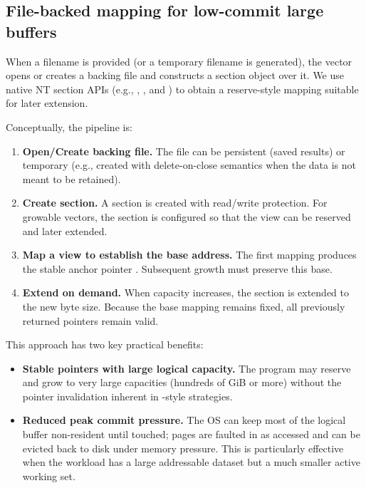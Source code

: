 \subsection{File-backed mapping for low-commit large buffers}
\label{sec:file_backed_mapping}

When a filename is provided (or a temporary filename is generated), the vector
opens or creates a backing file and constructs a section object over it. We use
native NT section APIs (e.g., ,
, and ) to obtain a
reserve-style mapping suitable for later extension.

Conceptually, the pipeline is:
\begin{enumerate}
  \item \textbf{Open/Create backing file.} The file can be persistent (saved
  results) or temporary (e.g., created with delete-on-close semantics when the
  data is not meant to be retained).
  \item \textbf{Create section.} A section is created with read/write
  protection. For growable vectors, the section is configured so that the view
  can be reserved and later extended.
  \item \textbf{Map a view to establish the base address.} The first mapping
  produces the stable anchor pointer . Subsequent growth must
  preserve this base.
  \item \textbf{Extend on demand.} When capacity increases, the section is
  extended to the new byte size. Because the base mapping remains fixed, all
  previously returned pointers remain valid.
\end{enumerate}

This approach has two key practical benefits:
\begin{itemize}
  \item \textbf{Stable pointers with large logical capacity.} The program may
  reserve and grow to very large capacities (hundreds of GiB or more) without
  the pointer invalidation inherent in -style strategies.
  \item \textbf{Reduced peak commit pressure.} The OS can keep most of the
  logical buffer non-resident until touched; pages are faulted in as accessed
  and can be evicted back to disk under memory pressure. This is particularly
  effective when the workload has a large addressable dataset but a much smaller
  active working set.
\end{itemize}


